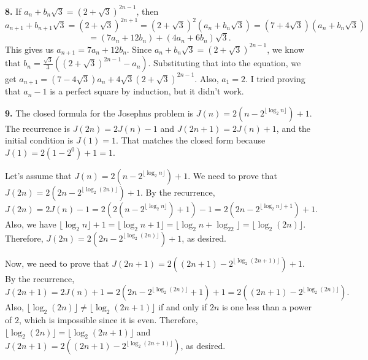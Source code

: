 \documentclass{article}
\begin{document}
\textbf{8.} If $a_n + b_n\sqrt{3} = (2 + \sqrt{3})^{2n - 1}$, then $$a_{n + 1} + b_{n + 1}\sqrt{3} = (2 + \sqrt{3})^{2n + 1} = (2 + \sqrt{3})^2(a_n + b_n\sqrt{3}) = (7 + 4\sqrt{3})(a_n + b_n\sqrt{3})$$ $$= (7a_n + 12b_n) + (4a_n + 6b_n)\sqrt{3}.$$ This gives us $a_{n + 1} = 7a_n + 12b_n$. Since $a_n + b_n\sqrt{3} = (2 + \sqrt{3})^{2n - 1}$, we know that $b_n = \frac{\sqrt{3}}{3}((2 + \sqrt{3})^{2n - 1} - a_n)$. Substituting that into the equation, we get $a_{n + 1} = (7 - 4\sqrt{3})a_n + 4\sqrt{3}(2 + \sqrt{3})^{2n - 1}$. Also, $a_1 = 2$. I tried proving that $a_n - 1$ is a perfect square by induction, but it didn't work.
\newline

\textbf{9.} The closed formula for the Josephus problem is $J(n) = 2(n - 2^{\lfloor\log_2n\rfloor}) + 1$. The recurrence is $J(2n) = 2J(n) - 1$ and $J(2n + 1) = 2J(n) + 1$, and the initial condition is $J(1) = 1$. That matches the closed form because $J(1) = 2(1 - 2^0) + 1 = 1$.
\newline

Let's assume that $J(n) = 2(n - 2^{\lfloor\log_2n\rfloor}) + 1$. We need to prove that $J(2n) = 2(2n - 2^{\lfloor\log_2(2n)\rfloor}) + 1$. By the recurrence, $$J(2n) = 2J(n) - 1 = 2(2(n - 2^{\lfloor\log_2n\rfloor}) + 1) - 1 = 2(2n - 2^{\lfloor\log_2n\rfloor + 1}) + 1.$$ Also, we have $\lfloor\log_2n\rfloor + 1 = \lfloor\log_2n + 1\rfloor = \lfloor\log_2n + \log_22\rfloor = \lfloor\log_2(2n)\rfloor$. Therefore, $J(2n) = 2(2n - 2^{\lfloor\log_2(2n)\rfloor}) + 1$, as desired.
\newline

Now, we need to prove that $J(2n + 1) = 2((2n + 1) - 2^{\lfloor\log_2(2n + 1)\rfloor}) + 1$. By the recurrence, $$J(2n + 1) = 2J(n) + 1 = 2(2n - 2^{\lfloor\log_2(2n)\rfloor} + 1) + 1 = 2((2n + 1) - 2^{\lfloor\log_2(2n)\rfloor}).$$ Also, $\lfloor\log_2(2n)\rfloor \neq \lfloor\log_2(2n + 1)\rfloor$ if and only if $2n$ is one less than a power of $2$, which is impossible since it is even. Therefore, $\lfloor\log_2(2n)\rfloor = \lfloor\log_2(2n + 1)\rfloor$ and $J(2n + 1) = 2((2n + 1) - 2^{\lfloor\log_2(2n + 1)\rfloor})$, as desired.
\newline
\end{document}
